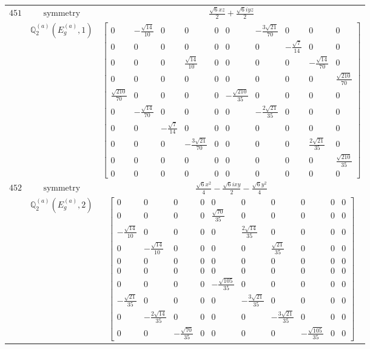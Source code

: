 \documentclass[fleqn,8pt,landscape]{jsarticle}
\begin{document}
\begin{longtable}{ccc}
$ 451 $ & $ \text{symmetry} $ & $ \frac{\sqrt{6} x z}{2} + \frac{\sqrt{6} i y z}{2} $ \\
$  $ & $ \mathbb{Q}_{2}^{(a)}(E_{g}^{(a)},1) $ & $ \begin{bmatrix} 0 & - \frac{\sqrt{14}}{10} & 0 & 0 & 0 & 0 & - \frac{3 \sqrt{21}}{70} & 0 & 0 & 0 \\ 0 & 0 & 0 & 0 & 0 & 0 & 0 & - \frac{\sqrt{7}}{14} & 0 & 0 \\ 0 & 0 & 0 & \frac{\sqrt{14}}{10} & 0 & 0 & 0 & 0 & - \frac{\sqrt{14}}{70} & 0 \\ 0 & 0 & 0 & 0 & 0 & 0 & 0 & 0 & 0 & \frac{\sqrt{210}}{70} \\ \frac{\sqrt{210}}{70} & 0 & 0 & 0 & 0 & - \frac{\sqrt{210}}{35} & 0 & 0 & 0 & 0 \\ 0 & - \frac{\sqrt{14}}{70} & 0 & 0 & 0 & 0 & - \frac{2 \sqrt{21}}{35} & 0 & 0 & 0 \\ 0 & 0 & - \frac{\sqrt{7}}{14} & 0 & 0 & 0 & 0 & 0 & 0 & 0 \\ 0 & 0 & 0 & - \frac{3 \sqrt{21}}{70} & 0 & 0 & 0 & 0 & \frac{2 \sqrt{21}}{35} & 0 \\ 0 & 0 & 0 & 0 & 0 & 0 & 0 & 0 & 0 & \frac{\sqrt{210}}{35} \\ 0 & 0 & 0 & 0 & 0 & 0 & 0 & 0 & 0 & 0 \end{bmatrix} $ \\ \hline
$ 452 $ & $ \text{symmetry} $ & $ \frac{\sqrt{6} x^{2}}{4} - \frac{\sqrt{6} i x y}{2} - \frac{\sqrt{6} y^{2}}{4} $ \\
$  $ & $ \mathbb{Q}_{2}^{(a)}(E_{g}^{(a)},2) $ & $ \begin{bmatrix} 0 & 0 & 0 & 0 & 0 & 0 & 0 & 0 & 0 & 0 \\ 0 & 0 & 0 & 0 & \frac{\sqrt{70}}{35} & 0 & 0 & 0 & 0 & 0 \\ - \frac{\sqrt{14}}{10} & 0 & 0 & 0 & 0 & \frac{2 \sqrt{14}}{35} & 0 & 0 & 0 & 0 \\ 0 & - \frac{\sqrt{14}}{10} & 0 & 0 & 0 & 0 & \frac{\sqrt{21}}{35} & 0 & 0 & 0 \\ 0 & 0 & 0 & 0 & 0 & 0 & 0 & 0 & 0 & 0 \\ 0 & 0 & 0 & 0 & 0 & 0 & 0 & 0 & 0 & 0 \\ 0 & 0 & 0 & 0 & - \frac{\sqrt{105}}{35} & 0 & 0 & 0 & 0 & 0 \\ - \frac{\sqrt{21}}{35} & 0 & 0 & 0 & 0 & - \frac{3 \sqrt{21}}{35} & 0 & 0 & 0 & 0 \\ 0 & - \frac{2 \sqrt{14}}{35} & 0 & 0 & 0 & 0 & - \frac{3 \sqrt{21}}{35} & 0 & 0 & 0 \\ 0 & 0 & - \frac{\sqrt{70}}{35} & 0 & 0 & 0 & 0 & - \frac{\sqrt{105}}{35} & 0 & 0 \end{bmatrix} $ \\ \hline

\end{longtable}
\end{document}
